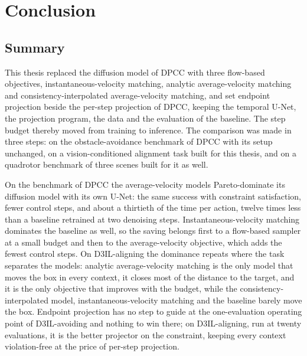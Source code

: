 
\chapter{Conclusion}\label{ch:conclusion}

\section{Summary}\label{sec:conc:summary}

This thesis replaced the diffusion model of \ac{DPCC} with three flow-based objectives,
instantaneous-velocity matching, analytic average-velocity matching and consistency-interpolated
average-velocity matching, and set endpoint projection beside the per-step projection of \ac{DPCC},
keeping the temporal U-Net, the projection program, the data and the evaluation of the baseline. The
step budget thereby moved from training to inference. The comparison was made in three steps: on the
obstacle-avoidance benchmark of \ac{DPCC} with its setup unchanged, on a vision-conditioned alignment
task built for this thesis, and on a quadrotor benchmark of three scenes built for it as well.

On the benchmark of \ac{DPCC} the average-velocity models Pareto-dominate its diffusion model with its
own U-Net: the same success with constraint satisfaction, fewer control steps, and about a thirtieth
of the time per action, twelve times less than a baseline retrained at two denoising steps.
Instantaneous-velocity matching dominates the baseline as well, so the saving belongs first to a
flow-based sampler at a small budget and then to the average-velocity objective, which adds the fewest
control steps. On D3IL-aligning the dominance repeats where the task separates the models: analytic
average-velocity matching is the only model that moves the box in every context, it closes most of
the distance to the target, and it is the only objective that improves with the budget, while the
consistency-interpolated model, instantaneous-velocity matching and the baseline barely move the box.
Endpoint projection has no step to guide at the one-evaluation operating point of D3IL-avoiding and
nothing to win there; on D3IL-aligning, run at twenty evaluations, it is the better projector on the
constraint, keeping every context violation-free at the price of per-step projection.

